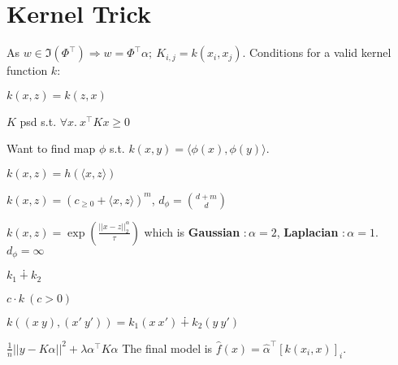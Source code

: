 \section{Kernel Trick}
As \(w \in \Im(\Phi^\top) \Rightarrow w = \Phi^\top \alpha; \ K_{i, j} = k(x_i, x_j)\).
Conditions for a valid kernel function \(k\): \\
\begin{itemize*}
  \item \(k(x, z) = k(z, x)\)
  \item \(K\) psd s.t. \(\forall x. \ x^\top K x \geq 0 \) \\
\end{itemize*}
Want to find map \(\phi\) s.t. \(k(x, y) = \langle\phi(x), \phi(y)\rangle\).

\begin{definition}
  \(k(x, z) = h(\langle x, z \rangle)\)
\end{definition}

\begin{definition}
  \(k(x, z) = (c_{\geq 0} + \langle x, z \rangle)^m\), \(d_\phi = \binom{d + m}{d}\)
\end{definition}

\begin{definition}
  \(k(x, z)  = \exp\left(\frac{||x - z||_2^\alpha}{\tau}\right)\) which is \textbf{Gaussian} \(: \alpha = 2\), \textbf{Laplacian} \(: \alpha = 1\). \(d_\phi = \infty\)
\end{definition}

\begin{definition}
  \begin{itemize*}
    \item \(k_1 \dotplus k_2\)
    \item \(c\cdot k \ (c >0)\)
    \item \(k((x \ y), (x' \ y')) = k_1(x \ x') \dotplus k_2(y \ y') \)
  \end{itemize*}
\end{definition}

\begin{definition}
  \(\frac{1}{n}||y - K\alpha||^2 + \lambda \alpha^\top K \alpha\)
  The final model is \(\hat{f}(x) = \hat{\alpha}^\top [k(x_i, x)]_i\).
\end{definition}